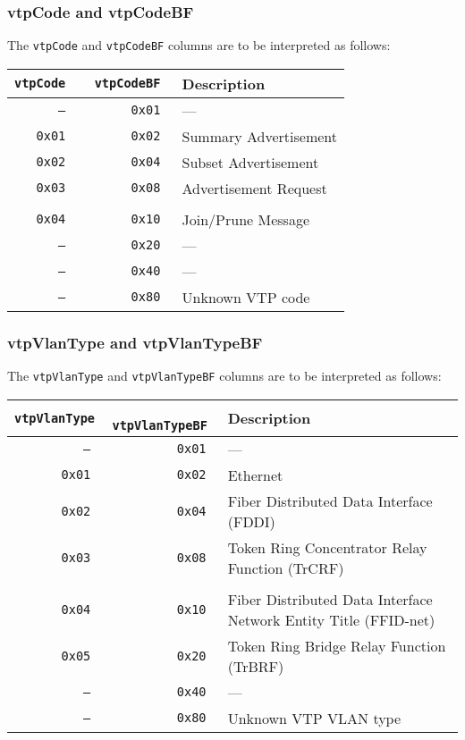 \documentclass[documentation]{subfiles}
\begin{document}
\subsubsection{vtpCode and vtpCodeBF}\label{vtpCode}
The {\tt vtpCode} and {\tt vtpCodeBF} columns are to be interpreted as follows:\\
\begin{longtable}{>{\tt}r>{\tt}rl}
    \toprule
    {\bf vtpCode} & {\bf vtpCodeBF} & {\bf Description}\\
    \midrule\endhead%
    ---  & 0x01 & ---\\
    0x01 & 0x02 & Summary Advertisement\\
    0x02 & 0x04 & Subset Advertisement\\
    0x03 & 0x08 & Advertisement Request\\
    \\
    0x04 & 0x10 & Join/Prune Message\\
    ---  & 0x20 & ---\\
    ---  & 0x40 & ---\\
    ---  & 0x80 & Unknown VTP code\\
    \bottomrule
\end{longtable}

\subsubsection{vtpVlanType and vtpVlanTypeBF}\label{vtpVlanType}
The {\tt vtpVlanType} and {\tt vtpVlanTypeBF} columns are to be interpreted as follows:\\
\begin{longtable}{>{\tt}r>{\tt}rl}
    \toprule
    {\bf vtpVlanType} & {\bf vtpVlanTypeBF} & {\bf Description}\\
    \midrule\endhead%
    ---  & 0x01 & ---\\
    0x01 & 0x02 & Ethernet\\
    0x02 & 0x04 & Fiber Distributed Data Interface (FDDI)\\
    0x03 & 0x08 & Token Ring Concentrator Relay Function (TrCRF)\\
    \\
    0x04 & 0x10 & Fiber Distributed Data Interface Network Entity Title (FFID-net)\\
    0x05 & 0x20 & Token Ring Bridge Relay Function (TrBRF)\\
    ---  & 0x40 & ---\\
    ---  & 0x80 & Unknown VTP VLAN type\\
    \bottomrule
\end{longtable}
\end{document}

